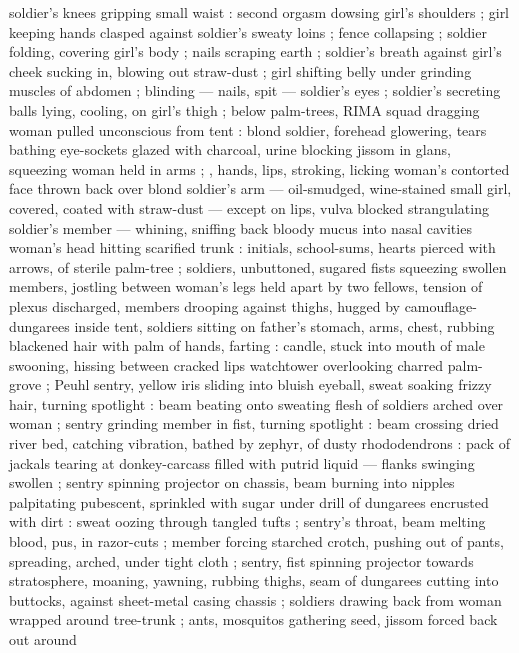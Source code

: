 soldier's knees gripping small waist : second orgasm dowsing girl's shoulders ; girl keeping hands
clasped against soldier's sweaty loins ; fence collapsing ; soldier folding, covering girl's body ;
nails scraping earth ; soldier's breath against girl's cheek sucking in, blowing out straw-dust ;
girl shifting belly under grinding muscles of abdomen ; blinding --- nails, spit --- soldier's eyes
; soldier's secreting balls lying, cooling, on girl's thigh ; below palm-trees, RIMA squad dragging
woman pulled unconscious from tent : blond soldier, forehead glowering, tears bathing eye-sockets
glazed with charcoal, urine blocking jissom in glans, squeezing woman held in arms ; , %
hands, lips, stroking, licking woman's contorted face thrown back over blond soldier's arm ---
oil-smudged, wine-stained {\semislash} small girl, covered, coated with straw-dust --- except on
lips, vulva blocked strangulating soldier's member --- whining, sniffing back bloody mucus into
nasal cavities {\semitwoslash} woman's head hitting scarified trunk : initials, school-sums, hearts
pierced with arrows, of sterile palm-tree ; soldiers, unbuttoned, sugared fists squeezing swollen
members, jostling between woman's legs held apart by two fellows, tension of plexus discharged,
members drooping against thighs, hugged by camouflage-dungarees {\semislash} inside tent, soldiers
sitting on father's stomach, arms, chest, rubbing blackened hair with palm of hands, farting :
candle, stuck into mouth of male swooning, hissing between cracked lips {\semislash} watchtower
overlooking charred palm-grove ; Peuhl sentry, yellow iris sliding into bluish eyeball, sweat
soaking frizzy hair, turning spotlight : beam beating onto sweating flesh of soldiers arched over
woman ; sentry grinding member in fist, turning spotlight : beam crossing dried river bed, catching
vibration, bathed by zephyr, of dusty rhododendrons : pack of jackals tearing at donkey-carcass
filled with putrid liquid --- flanks swinging swollen ; sentry spinning projector on chassis, beam
burning into nipples palpitating pubescent, sprinkled with sugar under drill of dungarees encrusted
with dirt : sweat oozing through tangled tufts ; sentry's throat, beam melting blood, pus, in
razor-cuts ; member forcing starched crotch, pushing out of pants, spreading, arched, under tight
cloth ; sentry, fist spinning projector towards stratosphere, moaning, yawning, rubbing thighs, seam
of dungarees cutting into buttocks, against sheet-metal casing chassis ; soldiers drawing back from
woman wrapped around tree-trunk ; ants, mosquitos gathering seed, jissom forced back out around
